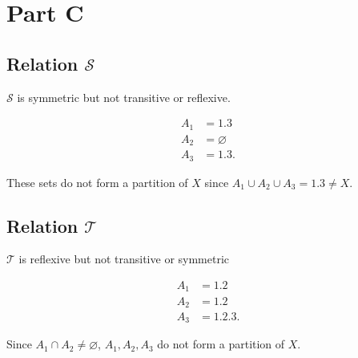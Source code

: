 \documentclass[12pt]{extarticle}
\begin{document}
\section*{Part C}
{
\setlength{\columnsep}{1cm}
\setlength{\columnseprule}{1pt}
\begin{multicols}{2}
	\subsection*{Relation $\mathcal{S}$}

	$\mathcal{S}$ is symmetric but not transitive or reflexive.

	\begin{align*}
		A_1 &= \qty{1, 3} \\
		A_2 &= \varnothing \\
		A_3 &= \qty{1, 3}
	.\end{align*}

	These sets do not form a partition of $X$ since $A_1 \cup A_2 \cup A_3 = \qty{1,3} \neq X$.

	\columnbreak

	\subsection*{Relation $\mathcal{T}$}
	$\mathcal{T}$ is reflexive but not transitive or symmetric

	\begin{align*}
		A_1 &= \qty{1, 2} \\
		A_2 &= \qty{1, 2} \\
		A_3 &= \qty{1, 2, 3}
	.\end{align*}

	Since $A_1 \cap A_2 \neq \varnothing$, $A_1, A_2, A_3$ do not form a partition of $X$.

\end{multicols}
}
\end{document}
